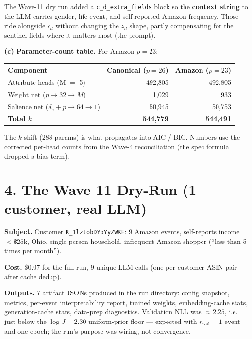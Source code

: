 \documentclass[11pt]{article}
\begin{document}
The Wave-11 dry run added a \texttt{c\_d\_extra\_fields} block so the \textbf{context string} to the LLM carries gender, life-event, and self-reported Amazon frequency. Those ride alongside $c_d$ without changing the $z_d$ shape, partly compensating for the sentinel fields where it matters most (the prompt).

\textbf{(c) Parameter-count table.} For Amazon $p=23$:

\begin{center}
\begin{tabular}{lrr}
\toprule
Component & Canonical ($p=26$) & Amazon ($p=23$) \\
\midrule
Attribute heads (M $=$ 5)              & 492{,}805 & 492{,}805 \\
Weight net ($p \to 32 \to M$)          &       1{,}029 &          933 \\
Salience net ($d_e + p \to 64 \to 1$)  &      50{,}945 &       50{,}753 \\
\midrule
\textbf{Total $k$} & \textbf{544{,}779} & \textbf{544{,}491} \\
\bottomrule
\end{tabular}
\end{center}

The $k$ shift (288 params) is what propagates into AIC / BIC. Numbers use the corrected per-head counts from the Wave-4 reconciliation (the spec formula dropped a bias term).

\section*{4. The Wave 11 Dry-Run (1 customer, real LLM)}

\textbf{Subject.} Customer \texttt{R\_1lztobDYoYyZWKF}: 9 Amazon events, self-reports income $< \$25\text{k}$, Ohio, single-person household, infrequent Amazon shopper (``less than 5 times per month'').

\textbf{Cost.} \$0.07 for the full run, 9 unique LLM calls (one per customer-ASIN pair after cache dedup).

\textbf{Outputs.} 7 artifact JSONs produced in the run directory: config snapshot, metrics, per-event interpretability report, trained weights, embedding-cache stats, generation-cache stats, data-prep diagnostics. Validation NLL was \textbf{$\approx 2.25$}, i.e. just below the $\log J = 2.30$ uniform-prior floor --- expected with $n_\text{val} = 1$ event and one epoch; the run's purpose was wiring, not convergence.
\end{document}
